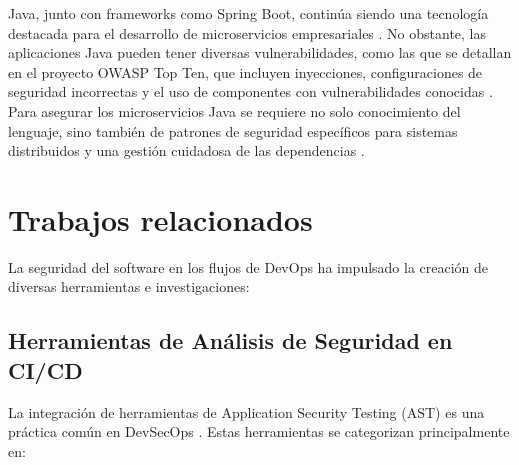 Java, junto con frameworks como Spring Boot, continúa siendo una tecnología destacada para el desarrollo de microservicios empresariales \cite{FiniteState2023JavaVulnerabilities}. No obstante, las aplicaciones Java pueden tener diversas vulnerabilidades, como las que se detallan en el proyecto OWASP Top Ten, que incluyen inyecciones, configuraciones de seguridad incorrectas y el uso de componentes con vulnerabilidades conocidas \cite{OWASP2021TopTen}. Para asegurar los microservicios Java se requiere no solo conocimiento del lenguaje, sino también de patrones de seguridad específicos para sistemas distribuidos y una gestión cuidadosa de las dependencias \cite{FiniteState2023JavaVulnerabilities, OWASP2021TopTen}.

\section{Trabajos relacionados}\label{sec:trabajos_relacionados}
La seguridad del software en los flujos de DevOps ha impulsado la creación de diversas herramientas e investigaciones:

\subsection{Herramientas de Análisis de Seguridad en CI/CD}
La integración de herramientas de Application Security Testing (AST) es una práctica común en DevSecOps \cite{Kumar2022DevSecOpsReview}. Estas herramientas se categorizan principalmente en:

